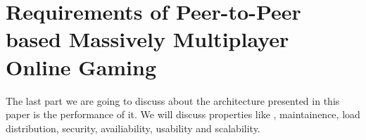 \section*{Requirements of Peer-to-Peer based Massively Multiplayer Online Gaming}

The last part we are going to discuss about the architecture presented in this paper is the performance of it. We will discuss properties like , maintainence, load distribution, security, availiability, usability and scalability.
